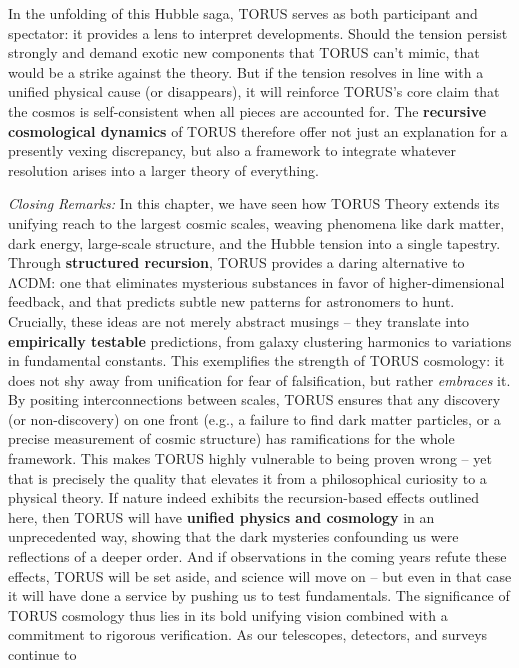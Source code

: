 \documentclass[
]{article}
\begin{document}
In the unfolding of this Hubble saga, TORUS serves as both participant
and spectator: it provides a lens to interpret developments. Should the
tension persist strongly and demand exotic new components that TORUS
can't mimic, that would be a strike against the theory. But if the
tension resolves in line with a unified physical cause (or disappears),
it will reinforce TORUS's core claim that the cosmos is self-consistent
when all pieces are accounted for. The \textbf{recursive cosmological
dynamics} of TORUS therefore offer not just an explanation for a
presently vexing discrepancy, but also a framework to integrate whatever
resolution arises into a larger theory of everything.

\emph{Closing Remarks:} In this chapter, we have seen how TORUS Theory
extends its unifying reach to the largest cosmic scales, weaving
phenomena like dark matter, dark energy, large-scale structure, and the
Hubble tension into a single tapestry. Through \textbf{structured
recursion}, TORUS provides a daring alternative to ΛCDM: one that
eliminates mysterious substances in favor of higher-dimensional
feedback, and that predicts subtle new patterns for astronomers to hunt.
Crucially, these ideas are not merely abstract musings -- they translate
into \textbf{empirically testable} predictions, from galaxy clustering
harmonics to variations in fundamental constants\hspace{0pt}. This
exemplifies the strength of TORUS cosmology: it does not shy away from
unification for fear of falsification, but rather \emph{embraces} it. By
positing interconnections between scales, TORUS ensures that any
discovery (or non-discovery) on one front (e.g., a failure to find dark
matter particles, or a precise measurement of cosmic structure) has
ramifications for the whole framework. This makes TORUS highly
vulnerable to being proven wrong -- yet that is precisely the quality
that elevates it from a philosophical curiosity to a physical theory. If
nature indeed exhibits the recursion-based effects outlined here, then
TORUS will have \textbf{unified physics and cosmology} in an
unprecedented way, showing that the dark mysteries confounding us were
reflections of a deeper order. And if observations in the coming years
refute these effects, TORUS will be set aside, and science will move on
-- but even in that case it will have done a service by pushing us to
test fundamentals. The significance of TORUS cosmology thus lies in its
bold unifying vision combined with a commitment to rigorous
verification. As our telescopes, detectors, and surveys continue to
\end{document}
